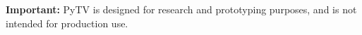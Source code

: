 \textbf{Important:}
PyTV is designed for research and prototyping purposes,
and is not intended for production use.
